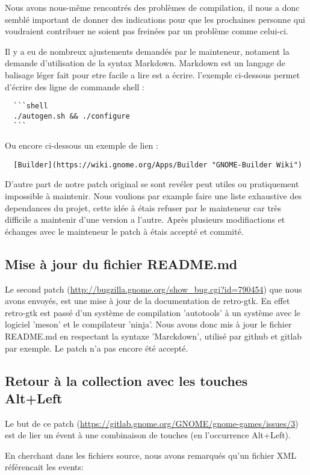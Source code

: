 \documentclass[12pt]{report}
\begin{document}
Nous avons nous-même rencontrés des problèmes de compilation, il nous a donc
semblé important de donner des indications pour que les prochaines personne qui
voudraient contribuer ne soient pas freinées par un problème comme celui-ci.

Il y a eu de nombreux ajustements demandés par le mainteneur, notament la demande
d'utilisation de la syntax Markdown.
Markdown est un langage de balisage léger fait pour etre facile a lire est a écrire.
l'exemple ci-dessous permet d'écrire des ligne de commande shell :
\begin{verbatim}
  ```shell
  ./autogen.sh && ./configure
  ```
\end{verbatim}
Ou encore ci-dessous un exemple de lien :
\begin{verbatim}
  [Builder](https://wiki.gnome.org/Apps/Builder "GNOME-Builder Wiki")
\end{verbatim}

D'autre part de notre patch original se sont revéler peut utiles ou pratiquement
impossible à maintenir. Nous voulions par example faire une liste exhaustive des
dependances du projet, cette idée à étais refuser par le mainteneur car très
difficile a maintenir d'une version a l'autre.
Après plusieurs modifiactions et échanges avec le mainteneur le patch à étais
accepté et commité.

\subsection{Mise à jour du fichier README.md}
\label{README}
Le second patch (\url{http://bugzilla.gnome.org/show_bug.cgi?id=790454}) 
que nous avons envoyés, est une mise à jour de la documentation de retro-gtk.
En effet retro-gtk est passé d'un système de compilation 'autotools' à un
système avec le logiciel 'meson' et le compilateur 'ninja'.
Nous avons donc mis à jour le fichier README.md en respectant la syntaxe
'Marckdown', utilisé par github et gitlab par exemple.
Le patch n'a pas encore été accepté.

\subsection{Retour à la collection avec les touches Alt+Left}
Le but de ce patch (\url{https://gitlab.gnome.org/GNOME/gnome-games/issues/3})
est de lier un évent à une combinaison de touches (en l’occurrence Alt+Left).

En cherchant dans les fichiers source, nous avons remarqués qu'un
fichier XML référencait les events:
\end{document}
